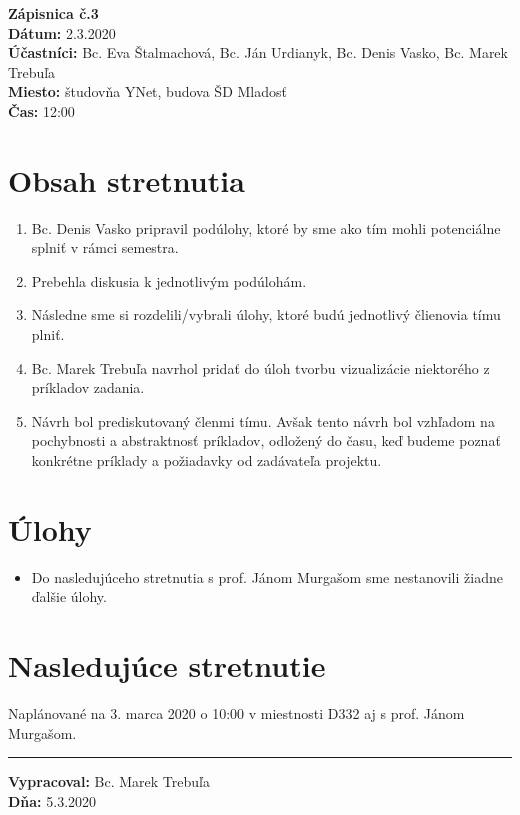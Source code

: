 
\usepackage{parskip}%

	\textbf{{\Huge Zápisnica č.3}}\\
			
	\textbf{Dátum:} 2.3.2020\\	
		
	\textbf{Účastníci:} Bc. Eva Štalmachová, Bc. Ján Urdianyk, Bc. Denis Vasko, Bc. Marek Trebuľa\\
		
	\textbf{Miesto:} študovňa YNet, budova ŠD Mladosť\\	
	
	\textbf{Čas:} 12:00    
    \section*{Obsah stretnutia}
    \begin{enumerate}
    	\item Bc. Denis Vasko pripravil podúlohy, ktoré by sme ako tím mohli potenciálne splniť v rámci semestra.
    	\item Prebehla diskusia k jednotlivým podúlohám.
    	\item Následne sme si rozdelili/vybrali úlohy, ktoré budú jednotlivý člienovia tímu plniť.
    	\item Bc. Marek Trebuľa navrhol pridať do úloh tvorbu vizualizácie niektorého z príkladov zadania.
    	\item Návrh bol prediskutovaný členmi tímu. Avšak tento návrh bol vzhľadom na pochybnosti a abstraktnosť príkladov, odložený do času, keď budeme poznať konkrétne príklady a požiadavky od zadávateľa projektu.
    \end{enumerate}    
    \section*{Úlohy}
    \begin{itemize}
    	\item Do nasledujúceho stretnutia s prof. Jánom Murgašom sme nestanovili žiadne ďalšie úlohy.
    \end{itemize}

    \section*{Nasledujúce stretnutie}

    Naplánované na 3. marca 2020 o 10:00 v miestnosti D332 aj s prof. Jánom Murgašom.
    
    \noindent\rule{15cm}{0.4pt}
   {\small 	\textbf{Vypracoval:} Bc. Marek Trebuľa\\
   \textbf{Dňa:} 5.3.2020 }
    

